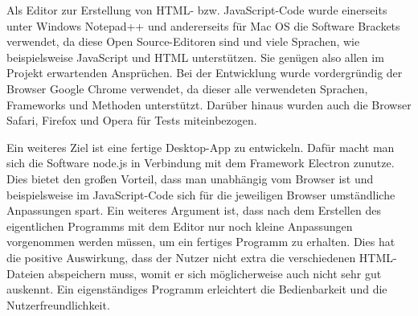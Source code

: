 Als Editor zur Erstellung von HTML- bzw. JavaScript-Code wurde einerseits unter Windows Notepad++ und andererseits für Mac OS die Software Brackets verwendet, da diese Open Source-Editoren sind und viele Sprachen, wie beispielsweise JavaScript und HTML unterstützen. Sie genügen also allen im Projekt erwartenden Ansprüchen.
Bei der Entwicklung wurde vordergründig der Browser Google Chrome verwendet, da dieser alle verwendeten Sprachen, Frameworks und Methoden unterstützt. Darüber hinaus wurden auch die Browser Safari, Firefox und Opera für Tests miteinbezogen.

Ein weiteres Ziel ist eine fertige Desktop-App zu entwickeln. Dafür macht man sich die Software node.js in Verbindung mit dem Framework Electron zunutze. Dies bietet den großen Vorteil, dass man unabhängig vom Browser ist und beispielsweise im JavaScript-Code sich für die jeweiligen Browser umständliche Anpassungen spart. Ein weiteres Argument ist, dass nach dem Erstellen des eigentlichen Programms mit dem Editor nur noch kleine Anpassungen vorgenommen werden müssen, um ein fertiges Programm zu erhalten. Dies hat die positive Auswirkung, dass der Nutzer nicht extra die verschiedenen HTML-Dateien abspeichern muss, womit er sich möglicherweise auch nicht sehr gut auskennt. Ein eigenständiges Programm erleichtert die Bedienbarkeit und die Nutzerfreundlichkeit. 


